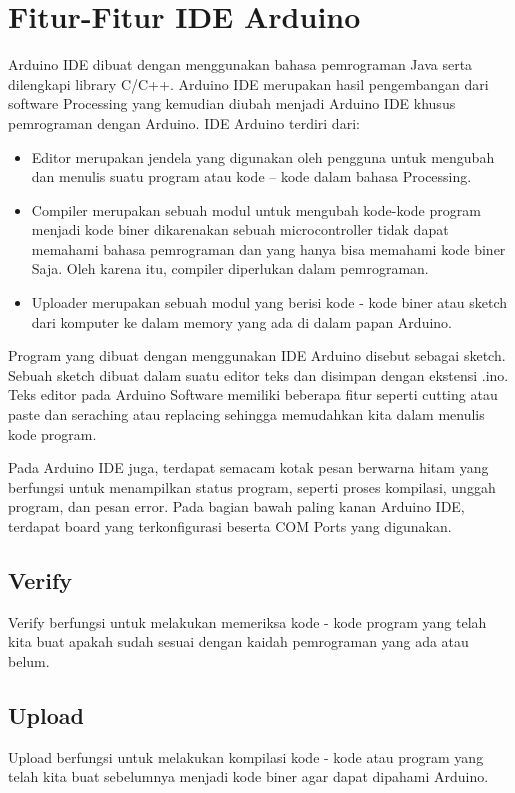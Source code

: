 \section{Fitur-Fitur IDE Arduino}

Arduino IDE dibuat dengan menggunakan bahasa pemrograman Java serta dilengkapi library C/C++. Arduino IDE merupakan hasil pengembangan dari software Processing yang kemudian diubah menjadi Arduino IDE khusus pemrograman dengan Arduino. IDE Arduino terdiri dari:

\begin{itemize}

\item Editor merupakan jendela yang digunakan oleh pengguna untuk mengubah dan menulis suatu program atau kode – kode dalam bahasa Processing.
\item Compiler merupakan sebuah modul untuk mengubah kode-kode program menjadi kode biner dikarenakan sebuah microcontroller tidak dapat memahami bahasa pemrograman dan yang hanya bisa memahami kode biner Saja. Oleh karena itu, compiler diperlukan dalam pemrograman.
\item Uploader merupakan sebuah modul yang berisi kode - kode biner atau sketch dari komputer ke dalam memory yang ada di dalam papan Arduino.
\end{itemize}

Program yang dibuat dengan menggunakan IDE Arduino disebut sebagai sketch. Sebuah sketch dibuat dalam suatu editor teks dan disimpan dengan ekstensi .ino. Teks editor pada Arduino Software memiliki beberapa fitur seperti cutting atau paste dan seraching atau replacing sehingga memudahkan kita dalam menulis kode program.

Pada Arduino IDE juga, terdapat semacam kotak pesan berwarna hitam yang berfungsi untuk menampilkan status program, seperti proses kompilasi, unggah program, dan pesan error. Pada bagian bawah paling kanan Arduino IDE, terdapat board yang terkonfigurasi beserta COM Ports yang digunakan.

\subsection{Verify}
Verify berfungsi untuk melakukan memeriksa kode - kode program yang telah kita buat apakah sudah sesuai dengan kaidah pemrograman yang ada atau belum.
\subsection{Upload}
Upload berfungsi untuk melakukan kompilasi kode - kode atau program yang telah kita buat sebelumnya menjadi kode biner agar dapat dipahami Arduino.
